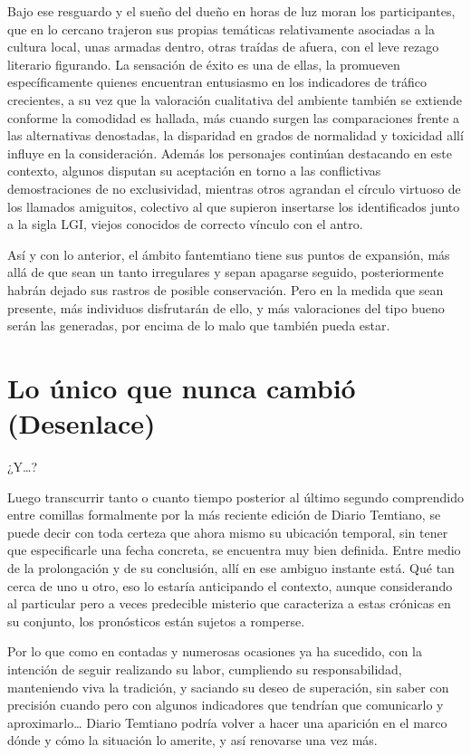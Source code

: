 \documentclass[
]{book}
\begin{document}
Bajo ese resguardo y el sueño del dueño en horas de luz moran los participantes, que en lo cercano trajeron sus propias temáticas relativamente asociadas a la cultura local, unas armadas dentro, otras traídas de afuera, con el leve rezago literario figurando. La sensación de éxito es una de ellas, la promueven específicamente quienes encuentran entusiasmo en los indicadores de tráfico crecientes, a su vez que la valoración cualitativa del ambiente también se extiende conforme la comodidad es hallada, más cuando surgen las comparaciones frente a las alternativas denostadas, la disparidad en grados de normalidad y toxicidad allí influye en la consideración. Además los personajes continúan destacando en este contexto, algunos disputan su aceptación en torno a las conflictivas demostraciones de no exclusividad, mientras otros agrandan el círculo virtuoso de los llamados amiguitos, colectivo al que supieron insertarse los identificados junto a la sigla LGI, viejos conocidos de correcto vínculo con el antro.

Así y con lo anterior, el ámbito fantemtiano tiene sus puntos de expansión, más allá de que sean un tanto irregulares y sepan apagarse seguido, posteriormente habrán dejado sus rastros de posible conservación. Pero en la medida que sean presente, más individuos disfrutarán de ello, y más valoraciones del tipo bueno serán las generadas, por encima de lo malo que también pueda estar.

\hypertarget{lo-uxfanico-que-nunca-cambiuxf3-desenlace}{%
\chapter{Lo único que nunca cambió (Desenlace)}\label{lo-uxfanico-que-nunca-cambiuxf3-desenlace}}

¿Y\ldots?

Luego transcurrir tanto o cuanto tiempo posterior al último segundo comprendido entre comillas formalmente por la más reciente edición de Diario Temtiano, se puede decir con toda certeza que ahora mismo su ubicación temporal, sin tener que especificarle una fecha concreta, se encuentra muy bien definida. Entre medio de la prolongación y de su conclusión, allí en ese ambiguo instante está. Qué tan cerca de uno u otro, eso lo estaría anticipando el contexto, aunque considerando al particular pero a veces predecible misterio que caracteriza a estas crónicas en su conjunto, los pronósticos están sujetos a romperse.

Por lo que como en contadas y numerosas ocasiones ya ha sucedido, con la intención de seguir realizando su labor, cumpliendo su responsabilidad, manteniendo viva la tradición, y saciando su deseo de superación, sin saber con precisión cuando pero con algunos indicadores que tendrían que comunicarlo y aproximarlo\ldots{} Diario Temtiano podría volver a hacer una aparición en el marco dónde y cómo la situación lo amerite, y así renovarse una vez más.
\end{document}
